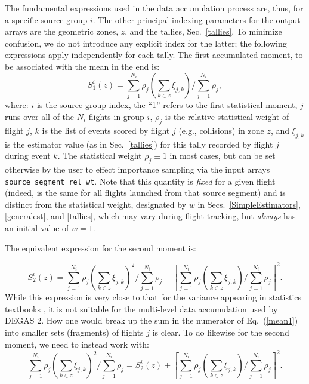 \documentclass[12pt]{report}
\begin{document}
The fundamental expressions used in the data accumulation
process are, thus, for a specific source group $i$.  The 
other principal indexing parameters for the output arrays
are the geometric zones, $z$, and the tallies, Sec.~\ref{tallies}.
To minimize confusion, we do not introduce any explicit
index for the latter; the following expressions apply
independently for each tally.  The first accumulated moment,
to be associated with the mean in the end is:
\begin{equation}
S_{1}^{i}(z) = \sum_{j = 1}^{N_{i}} \rho_{j} \left (
\sum_{k \in z} \xi_{j,k} \right ) / \sum_{j = 1}^{N_{i}} \rho_{j},
\label{mean1}
\end{equation}
where: $i$ is the source group index, the ``1'' refers to the
first statistical moment, $j$ runs over all of the
$N_{i}$ flights in group $i$, $\rho_{j}$ is the relative
statistical weight of flight $j$, $k$ is the list of events 
scored
by flight $j$ (e.g., collisions)
in zone $z$, and $\xi_{j,k}$ is the estimator
value (as in Sec.~\ref{tallies}) 
for this tally recorded by flight $j$ during event $k$.
The statistical weight $\rho_{j} \equiv 1$ in most cases,
but can be set otherwise by the user to effect importance
sampling via the input arrays {\tt source\_segment\_rel\_wt}.
Note that this quantity is {\em fixed} for a given flight
(indeed, is the same for all flights launched from that
source segment) and is distinct from the statistical
weight, designated by $w$ in Secs.~\ref{SimpleEstimators},
\ref{generalest}, and \ref{tallies}, which may
vary during flight tracking, but {\em always} has 
an initial value of $w = 1$.

The equivalent expression for the second moment is:

\begin{equation}
S_{2}^{i}(z) = \sum_{j = 1}^{N_{i}} \rho_{j} \left (
\sum_{k \in z} \xi_{j,k} \right )^{2} / \sum_{j = 1}^{N_{i}} \rho_{j}
- \left [ \sum_{j = 1}^{N_{i}} \rho_{j} \left (
\sum_{k \in z} \xi_{j,k} \right ) / \sum_{j = 1}^{N_{i}} \rho_{j} \right ]^{2}.
\label{var1}
\end{equation}
While this expression is very close to that for the
variance appearing in statistics textbooks \cite{Bran2014}, it is not
suitable for the multi-level data accumulation used by
DEGAS 2.  
How one would break up the sum in the
numerator of Eq.~(\ref{mean1}) into smaller
sets (fragments) of
flights $j$ is clear.
To do likewise for the second moment, we need to instead
work with:
\begin{equation}
\sum_{j = 1}^{N_{i}} \rho_{j} \left (
\sum_{k \in z} \xi_{j,k} \right )^{2} / \sum_{j = 1}^{N_{i}} \rho_{j} 
= S_{2}^{i}(z) + 
\left [ \sum_{j = 1}^{N_{i}} \rho_{j} \left (
\sum_{k \in z} \xi_{j,k} \right ) / \sum_{j = 1}^{N_{i}} \rho_{j} \right ]^{2}.
\label{var2}
\end{equation}
\end{document}

